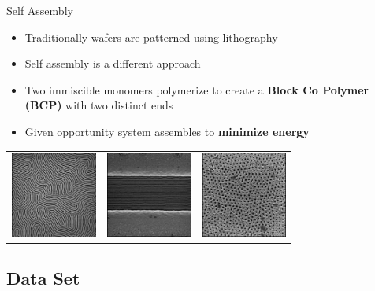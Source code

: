 \documentclass{beamer}
\begin{document}
\begin{frame}{Self Assembly}

 \begin{itemize}
  \item
    Traditionally wafers are patterned using lithography
  \item
    Self assembly is a different approach 
  \item
   Two immiscible monomers polymerize to create a \textbf{Block Co Polymer (BCP)} with two distinct ends
   \item
    Given opportunity system assembles to \textbf{minimize energy}

  \end{itemize}

\begin{center}
  \begin{tabular}{ccc}
  	     \includegraphics[height=80pt]{images/FFT_in.jpeg}  & \includegraphics[height=80pt]{images/image16.jpeg} & \includegraphics[height=80pt]{images/image10.jpeg}
  \end{tabular}
\end{center}

\end{frame}


\subsection{Data Set}
\end{document}
